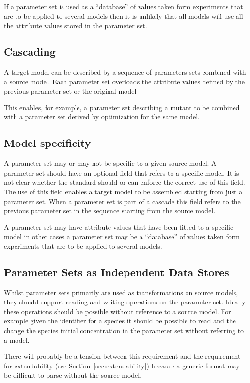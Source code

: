 \documentclass[10pt,twocolumntoc]{cekarticle}
\begin{document}
If a parameter set is used as a ``database'' of values taken form experiments that are to be
applied to several models then it is unlikely that all models will use all the attribute values
stored in the parameter set.

\subsection{Cascading}
\label{sec:cascading}
A target model can be described by a sequence of parameters sets combined with a source model.
Each parameter set overloads the attribute values defined by the previous parameter set or
the original model

This enables, for example, a parameter set describing a mutant to be combined with a parameter
set derived by optimization for the same model.

\subsection{Model specificity}
\label{sec:specificity}
A parameter set may or may not be specific to a given source model.  A parameter set should
have an optional field that refers to a specific model.  It is not clear whether the standard
should or can enforce the correct use of this field.  The use of this field enables a target
model to be assembled starting from just a parameter set.  When a parameter set is part of a
cascade this field refers to the previous parameter set in the sequence starting from the
source model.

A parameter set may have attribute values that have been fitted to a specific model in other
cases a parameter set may be a ``database'' of values taken form experiments that are to be
applied to several models.

\subsection{Parameter Sets as Independent Data Stores}
\label{sec:datastore}
Whilst parameter sets primarily are used as transformations on source models, they should support
reading and writing operations on the parameter set.  Ideally these operations should be possible
without reference to a source model.  For example given the identifier for a species it should be
possible to read and the change the species initial concentration in the parameter set without
referring to a model.

There will probably be a tension between this requirement and the requirement for extendability
(see Section~\ref{sec:extendability}) because a generic format may be difficult to parse without
the source model.
\end{document}
